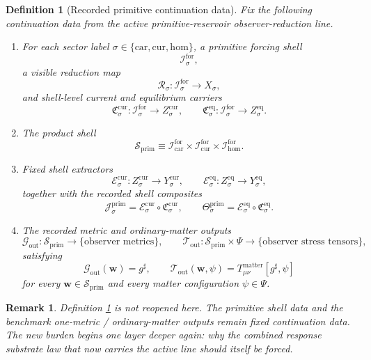 \documentclass[11pt]{article}
\newcommand{\CompletedMetric}{g^{\sharp}}
\newcommand{\Car}{\mathrm{car}}
\newcommand{\Cur}{\mathrm{cur}}
\newcommand{\Hom}{\mathrm{hom}}
\newcommand{\ForSpace}[1]{\mathcal I_{#1}^{\mathrm{for}}}
\newcommand{\PrimShell}{\mathcal S_{\mathrm{prim}}}
\newcommand{\Reduction}[1]{\mathcal R_{#1}}
\newcommand{\CurrentCarrier}[1]{\mathfrak C_{#1}^{\mathrm{cur}}}
\newcommand{\EqCarrier}[1]{\mathfrak C_{#1}^{\mathrm{eq}}}
\newcommand{\CurrentExtract}[1]{\mathscr E_{#1}^{\mathrm{cur}}}
\newcommand{\EqExtract}[1]{\mathscr E_{#1}^{\mathrm{eq}}}
\newcommand{\PrimCurrent}[1]{\mathcal J_{#1}^{\mathrm{prim}}}
\newcommand{\PrimTheta}[1]{\Theta_{#1}^{\mathrm{prim}}}
\newcommand{\MetricOut}{\mathscr G_{\mathrm{out}}}
\newcommand{\MatterOut}{\mathscr T_{\mathrm{out}}}
\newtheorem{definition}{Definition}
\newtheorem{remark}{Remark}
\begin{document}
\begin{definition}[Recorded primitive continuation data]
\label{def:fixed}
Fix the following continuation data from the active primitive-reservoir observer-reduction line.
\begin{enumerate}
    \item For each sector label \(\sigma\in\{\Car,\Cur,\Hom\}\), a primitive forcing shell
    \[
    \ForSpace{\sigma},
    \]
    a visible reduction map
    \[
    \Reduction{\sigma}:\ForSpace{\sigma}\to X_{\sigma},
    \]
    and shell-level current and equilibrium carriers
    \[
    \CurrentCarrier{\sigma}:\ForSpace{\sigma}\to Z_{\sigma}^{\mathrm{cur}},
    \qquad
    \EqCarrier{\sigma}:\ForSpace{\sigma}\to Z_{\sigma}^{\mathrm{eq}}.
    \]
    \item The product shell
    \[
    \PrimShell
    \equiv
    \ForSpace{\Car}\times \ForSpace{\Cur}\times \ForSpace{\Hom}.
    \]
    \item Fixed shell extractors
    \[
    \CurrentExtract{\sigma}:Z_{\sigma}^{\mathrm{cur}}\to Y_{\sigma}^{\mathrm{cur}},
    \qquad
    \EqExtract{\sigma}:Z_{\sigma}^{\mathrm{eq}}\to Y_{\sigma}^{\mathrm{eq}},
    \]
    together with the recorded shell composites
    \begin{equation}
    \PrimCurrent{\sigma}
    =
    \CurrentExtract{\sigma}\circ \CurrentCarrier{\sigma},
    \qquad
    \PrimTheta{\sigma}
    =
    \EqExtract{\sigma}\circ \EqCarrier{\sigma}.
    \label{eq:primcomposites}
    \end{equation}
    \item The recorded metric and ordinary-matter outputs
    \[
    \MetricOut:\PrimShell\to\{\text{observer metrics}\},
    \qquad
    \MatterOut:\PrimShell\times\Psi\to\{\text{observer stress tensors}\},
    \]
    satisfying
    \begin{equation}
    \MetricOut(\mathbf w)=\CompletedMetric,
    \qquad
    \MatterOut(\mathbf w,\psi)
    =
    T_{\mu\nu}^{\mathrm{matter}}[\CompletedMetric,\psi]
    \label{eq:fixedoutputs}
    \end{equation}
    for every \(\mathbf w\in\PrimShell\) and every matter configuration \(\psi\in\Psi\).
\end{enumerate}
\end{definition}

\begin{remark}
Definition \ref{def:fixed} is not reopened here. The primitive shell data and the benchmark one-metric / ordinary-matter outputs remain fixed continuation data. The new burden begins one layer deeper again: why the combined response substrate law that now carries the active line should itself be forced.
\end{remark}
\end{document}
